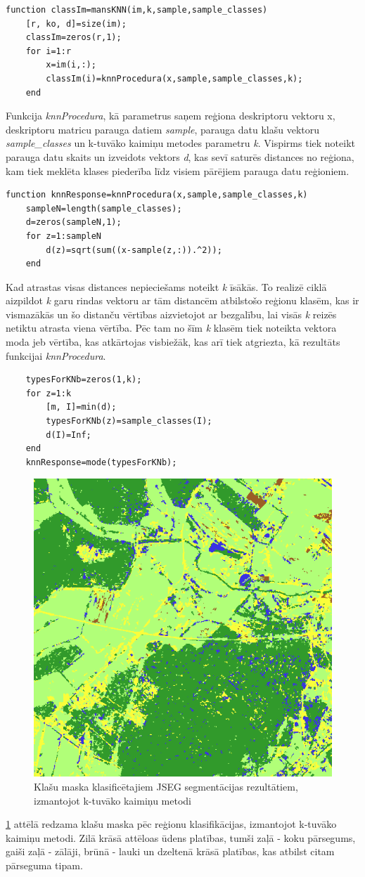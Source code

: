 \documentclass[12pt,paper=a4]{report}
\begin{document}
\begin{lstlisting}
function classIm=mansKNN(im,k,sample,sample_classes)
    [r, ko, d]=size(im);
    classIm=zeros(r,1);
    for i=1:r
        x=im(i,:);
        classIm(i)=knnProcedura(x,sample,sample_classes,k);
    end
\end{lstlisting}\par
Funkcija \textit{knnProcedura}, kā parametrus saņem reģiona deskriptoru vektoru x, deskriptoru matricu parauga datiem \textit{sample}, parauga datu klašu vektoru \textit{sample_classes} un k-tuvāko kaimiņu metodes parametru \textit{k}. Vispirms tiek noteikt parauga datu skaits un izveidots vektors \textit{d}, kas sevī saturēs distances no reģiona, kam tiek meklēta klases piederība līdz visiem pārējiem parauga datu reģioniem.
\begin{lstlisting}
function knnResponse=knnProcedura(x,sample,sample_classes,k)
    sampleN=length(sample_classes);
    d=zeros(sampleN,1);
    for z=1:sampleN
        d(z)=sqrt(sum((x-sample(z,:)).^2));
    end
\end{lstlisting}\par
Kad atrastas visas distances nepieciešams noteikt \textit{k} īsākās. To realizē ciklā aizpildot \textit{k} garu rindas vektoru ar tām distancēm atbilstošo reģionu klasēm, kas ir vismazākās un šo distanču vērtības aizvietojot ar bezgalību, lai visās \textit{k} reizēs netiktu atrasta viena vērtība. Pēc tam no šīm \textit{k} klasēm tiek noteikta vektora moda jeb vērtība, kas atkārtojas visbiežāk, kas arī tiek atgriezta, kā rezultāts funkcijai \textit{knnProcedura}.
\begin{lstlisting}
    typesForKNb=zeros(1,k);
    for z=1:k
        [m, I]=min(d);
        typesForKNb(z)=sample_classes(I);
        d(I)=Inf;
    end
    knnResponse=mode(typesForKNb);
\end{lstlisting}\par
\begin{figure}[h!]
\centering
\includegraphics[width=.6\linewidth]{result}
\caption{Klašu maska klasificētajiem JSEG segmentācijas rezultātiem, izmantojot k-tuvāko kaimiņu metodi}
\label{fig:resultKNN}
\end{figure}
\ref{fig:resultKNN} attēlā redzama klašu maska pēc reģionu klasifikācijas, izmantojot k-tuvāko kaimiņu metodi. Zilā krāsā attēloas ūdens platības, tumši zaļā - koku pārsegums, gaiši zaļā - zālāji, brūnā - lauki un dzeltenā krāsā platības, kas atbilst citam pārseguma tipam.
\end{document}

